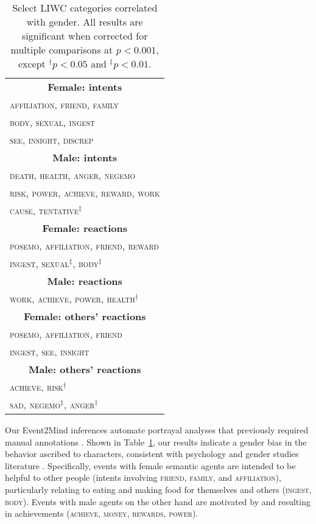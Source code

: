 \documentclass[11pt,a4paper]{article}
\begin{document}
\begin{table}[ht]
\centering



\begin{tabular}{p{}}
\toprule
\multicolumn{1}{c}{\textbf{Female: intents}}         \\
\textsc{affiliation, friend, family} \\
\textsc{body, sexual, ingest}\\
\textsc{see, insight, discrep}\\
\multicolumn{1}{c}{\textbf{Male: intents}}           \\
\textsc{death, health, anger, negemo}                        \\
\textsc{risk, power, achieve, reward, work}       \\
\textsc{cause, tentative$^\ddagger$}       \\
\midrule
\multicolumn{1}{c}{\textbf{Female: reactions}}       \\ 
\textsc{posemo, affiliation, friend, reward}   \\
\textsc{ingest, sexual$^\ddagger$, body$^\ddagger$}                   \\
\multicolumn{1}{c}{\textbf{Male: reactions}}         \\ 
\textsc{work, achieve, power, health$^\dagger$}                        \\
\midrule
\multicolumn{1}{c}{\textbf{Female: others' reactions}}\\ 
\textsc{posemo, affiliation, friend}  \\
\textsc{ingest, see, insight}\\
\multicolumn{1}{c}{\textbf{Male: others' reactions}}\\ 
\textsc{achieve, risk$^\dagger$} \\
\textsc{sad, negemo$^\ddagger$, anger$^\dagger$} \\
\bottomrule
\end{tabular}

\caption{Select LIWC categories correlated with gender. All results are significant when corrected for multiple comparisons at $p<0.001$, except $^\dagger p<0.05$ and $^\ddagger p<0.01$.
}
\label{tab:LIWCmovies}
\end{table}

Our Event2Mind inferences automate portrayal analyses that previously required manual annotations \cite{behm2008mean,prentice2002women,england2011gender}.
Shown in Table~\ref{tab:LIWCmovies},
our results indicate a  gender bias in the behavior ascribed to characters, consistent with psychology and gender studies literature \cite{collins2011content}. 
Specifically, events with female semantic agents are intended to be helpful to other people (intents involving \textsc{friend}, \textsc{family}, and \textsc{affiliation}), particularly relating to eating and making food for themselves and others (\textsc{ingest}, \textsc{body}).
Events with male agents on the other hand are motivated by and resulting in achievements (\textsc{achieve}, \textsc{money}, \textsc{rewards}, \textsc{power}).
\end{document}
